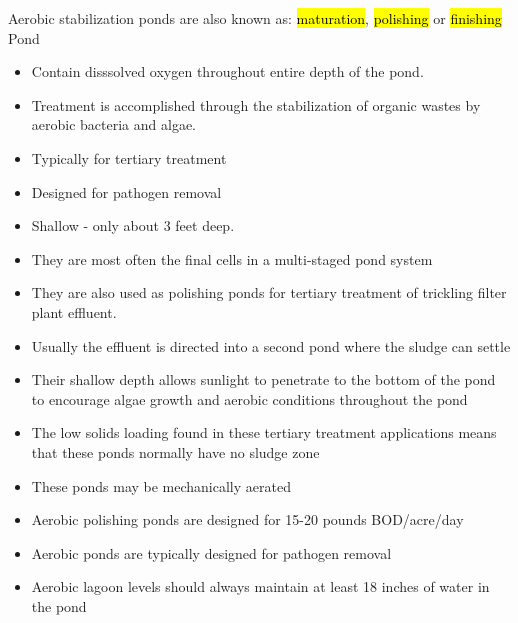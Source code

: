 Aerobic stabilization ponds are also known as: \hl{maturation}, \hl{polishing} or \hl{finishing} Pond
\begin{itemize}
\item Contain disssolved oxygen throughout entire depth of the pond.
\item Treatment is accomplished through the stabilization of organic wastes by aerobic bacteria and algae.
\item Typically for tertiary treatment
\item Designed for pathogen removal
\item Shallow - only about 3 feet deep. 
\item They are most often the final cells in a multi-staged pond system
\item They are also used as polishing ponds for tertiary treatment of trickling filter plant effluent.
\item Usually the effluent is directed into a second pond where the sludge can settle 
\item Their shallow depth allows sunlight to penetrate to the bottom of the pond to encourage algae growth and aerobic conditions throughout the pond 
\item The low solids loading found in these tertiary treatment applications means that these ponds normally have no sludge zone
\item These ponds may be mechanically aerated 
\item Aerobic polishing ponds are designed for 15-20 pounds BOD/acre/day
\item Aerobic ponds are typically designed for pathogen removal
\item Aerobic lagoon levels should always maintain at least 18 inches of water in the pond
\end{itemize}



